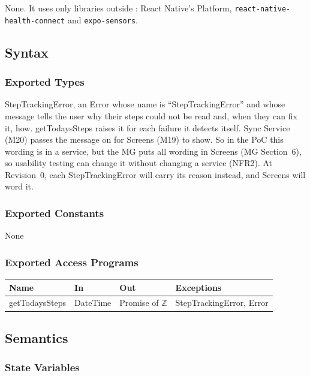 \documentclass[12pt, titlepage]{article}
\begin{document}
{\raggedright
None. It uses only libraries outside \progname{}: React Native's Platform,
\texttt{react-native-health-connect} and \texttt{expo-sensors}.\par}

\subsection{Syntax}

\subsubsection{Exported Types}

\noindent StepTrackingError, an Error whose name is ``StepTrackingError'' and
whose message tells the user why their steps could not be read and, when they
can fix it, how. getTodaysSteps raises it for each failure it detects itself.
Sync Service (M20) passes the message on for Screens (M19) to show. So in the PoC
this wording is in a service, but the MG puts all wording in Screens (MG
Section~6), so usability testing can change it without changing a service
(NFR2). At Revision~0, each StepTrackingError will carry its reason instead,
and Screens will word it.

\subsubsection{Exported Constants}

None

\subsubsection{Exported Access Programs}

\begin{center}
\begin{tabular}{p{3cm} p{2.4cm} p{3cm} p{4cm}}
\toprule
\textbf{Name} & \textbf{In} & \textbf{Out} & \textbf{Exceptions} \\
\midrule
getTodaysSteps & DateTime & Promise of $\mathbb{Z}$ & StepTrackingError, Error \\
\bottomrule
\end{tabular}
\end{center}

\subsection{Semantics}

\subsubsection{State Variables}
\end{document}
